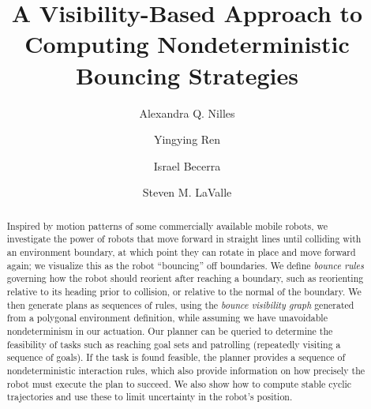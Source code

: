 \documentclass[]{article}
\begin{document}


\title{A Visibility-Based Approach to Computing Nondeterministic Bouncing
Strategies}

\author[1]{Alexandra Q. Nilles}
\author[2]{Yingying Ren}
\author[3]{Israel Becerra}
\author[4]{Steven M. LaValle}


\maketitle

\begin{abstract}
Inspired by motion patterns of some commercially available mobile robots, we
investigate the power of robots that move forward in straight lines until
colliding with an environment boundary, at which point they can rotate in place
and move forward again; we visualize this as the robot ``bouncing'' off
boundaries. We define {\em bounce rules} governing how the robot should reorient
after reaching a boundary, such as reorienting relative to its heading prior to 
collision, or relative to the normal of the boundary. We then generate plans as sequences of rules, using the
{\em bounce visibility graph} generated from a polygonal environment definition,
while assuming we have unavoidable nondeterminism in our actuation. Our planner
can be queried to determine the feasibility of tasks such as reaching goal sets
and patrolling (repeatedly visiting a sequence of goals). If the task is
found feasible, the planner provides a sequence of nondeterministic interaction rules,
which also provide information on how precisely the robot must execute the plan
to succeed. We also show how to compute stable cyclic trajectories and use these
to limit uncertainty in the robot's position.
\end{abstract}
\end{document}

